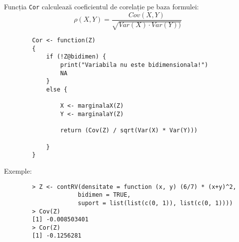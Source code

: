 \documentclass[12pt]{article}
\begin{document}
	Funcția \texttt{Cor} calculează coeficientul de corelație pe baza formulei:
	\begin{equation*}
		\rho(X, Y) = \frac{Cov(X, Y)}{\sqrt{Var(X) \cdot Var(Y))}}
	\end{equation*}\pagebreak
	
	\begin{lstlisting}
		Cor <- function(Z)
		{
			if (!Z@bidimen) {
				print("Variabila nu este bidimensionala!")
				NA
			}
			else {
				
				X <- marginalaX(Z)
				Y <- marginalaY(Z)
				
				return (Cov(Z) / sqrt(Var(X) * Var(Y)))
				
			}
		}
	\end{lstlisting}\vspace*{2\baselineskip}
	
	Exemple:
	\begin{lstlisting}
		> Z <- contRV(densitate = function (x, y) (6/7) * (x+y)^2,
		             bidimen = TRUE,
		             suport = list(list(c(0, 1)), list(c(0, 1))))
		> Cov(Z)
		[1] -0.008503401
		> Cor(Z)
		[1] -0.1256281
	\end{lstlisting}
	
\end{document}

